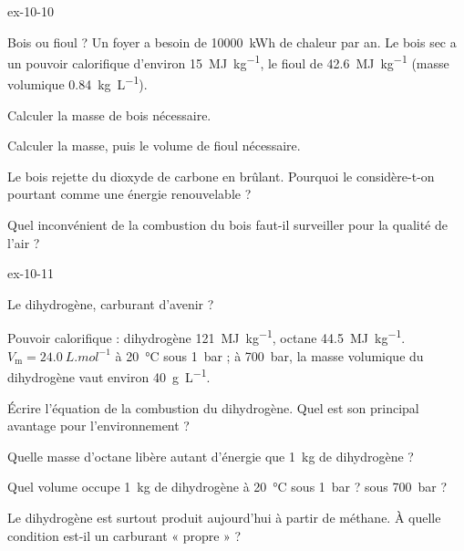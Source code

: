 \begin{blocLivre}{ex-10-10}
\begin{exercice}[2]{Bois ou fioul ?}
Un foyer a besoin de \qty{10000}{kWh} de chaleur par an. Le bois sec a un pouvoir calorifique d'environ \qty{15}{MJ.kg^{-1}}, le fioul de
\qty{42,6}{MJ.kg^{-1}} (masse volumique \qty{0,84}{kg.L^{-1}}).
\begin{questions}
\item Calculer la masse de bois nécessaire.
\item Calculer la masse, puis le volume de fioul nécessaire.
\item Le bois rejette du dioxyde de carbone en brûlant. Pourquoi le considère-t-on pourtant comme une énergie
renouvelable ?
\item Quel inconvénient de la combustion du bois faut-il surveiller pour la qualité de l'air ?
\end{questions}
\end{exercice}
\end{blocLivre}
\begin{blocLivre}{ex-10-11}
\begin{exercice}[2]{Le dihydrogène, carburant d'avenir ?}
\begin{donnees}
Pouvoir calorifique : dihydrogène \qty{121}{MJ.kg^{-1}}, octane \qty{44,5}{MJ.kg^{-1}}. $V_\mathrm{m}=\qty{24,0}{L.mol^{-1}}$ à \qty{20}{\degreeCelsius} sous \qty{1}{bar} ; à
\qty{700}{bar}, la masse volumique du dihydrogène vaut environ \qty{40}{g.L^{-1}}.
\end{donnees}
\begin{questions}
\item Écrire l'équation de la combustion du dihydrogène. Quel est son principal avantage pour l'environnement ?
\item Quelle masse d'octane libère autant d'énergie que \qty{1}{kg} de dihydrogène ?
\item Quel volume occupe \qty{1}{kg} de dihydrogène à \qty{20}{\degreeCelsius} sous \qty{1}{bar} ? sous \qty{700}{bar} ?
\item Le dihydrogène est surtout produit aujourd'hui à partir de méthane. À quelle condition est-il un carburant « propre » ?
\end{questions}
\end{exercice}
\end{blocLivre}
